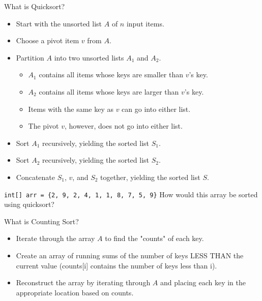 \documentclass[9pt]{beamer}
\begin{document}
\begin{frame}{What is Quicksort?}
\begin{itemize}
\item Start with the unsorted list $A$ of $n$ input items.
\item Choose a pivot item $v$ from $A$.
\item Partition $A$ into two unsorted lists $A_1$ and $A_2$.
	\begin{itemize}
	\item $A_1$ contains all items whose keys are smaller than $v$'s key.
	\item $A_2$ contains all items whose keys are larger than $v$'s key.
	\item Items with the same key as $v$ can go into either list.
	\item The pivot $v$, however, does not go into either list.
	\end{itemize}
\item Sort $A_1$ recursively, yielding the sorted list $S_1$.
\item Sort $A_2$ recursively, yielding the sorted list $S_2$.
\item Concatenate $S_1$, $v$, and $S_2$ together, yielding the sorted list $S$.
\end{itemize}

{\tt int[] arr = \{2, 9, 2, 4, 1, 1, 8, 7, 5, 9\}} \newline
How would this array be sorted using quicksort? \newline \newline \newline \newline \newline
\end{frame}


\begin{frame}[fragile]{What is Counting Sort?}
\begin{itemize}
\item Iterate through the array $A$ to find the "counts" of each key.
\item Create an array of running sums of the number of keys LESS THAN the current value (counts[i] contains the number of keys less than i).
\item Reconstruct the array by iterating through $A$ and placing each key in the appropriate location based on counts.
\end{itemize}
\end{frame}
\end{document}

